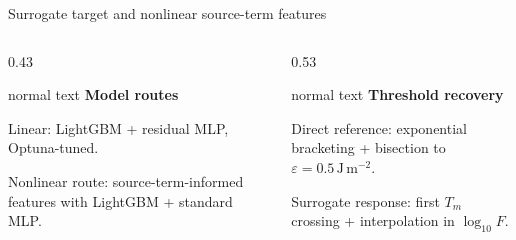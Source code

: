 \documentclass[aspectratio=169,10pt]{beamer}
\begin{document}
\begin{frame}[t]{Surrogate target and nonlinear source-term features}
  \vspace{0.12cm}
  \begin{columns}[T,totalwidth=0.96\textwidth]
    \begin{column}{0.43\textwidth}
      \begin{beamercolorbox}[wd=\linewidth,sep=0.46em]{normal text}
        \scriptsize
        \textbf{\color{GVSlate}Model routes}\par
        Linear: LightGBM + residual MLP, Optuna-tuned.\par
        Nonlinear route: source-term-informed features with LightGBM + standard MLP.
      \end{beamercolorbox}
    \end{column}
    \begin{column}{0.53\textwidth}
      \begin{beamercolorbox}[wd=\linewidth,sep=0.46em]{normal text}
        \scriptsize
        \textbf{\color{GVTitleRed}Threshold recovery}\par
        Direct reference: exponential bracketing + bisection to
        \(\varepsilon=0.5\,\mathrm{J\,m^{-2}}\).\par
        Surrogate response: first \(T_m\) crossing + interpolation in \(\log_{10}F\).
      \end{beamercolorbox}
    \end{column}
  \end{columns}
\end{frame}
\end{document}
